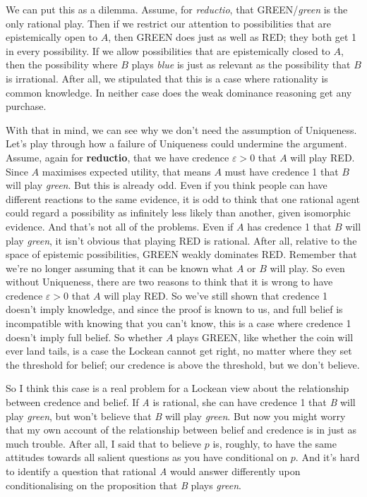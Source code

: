 We can put this as a dilemma. Assume, for \textit{reductio}, that GREEN/\textit{green} is the only rational play. Then if we restrict our attention to possibilities that are epistemically open to $A$, then GREEN does just as well as RED; they both get 1 in every possibility. If we allow possibilities that are epistemically closed to $A$, then the possibility where $B$ plays \textit{blue} is just as relevant as the possibility that $B$ is irrational. After all, we stipulated that this is a case where rationality is common knowledge. In neither case does the weak dominance reasoning get any purchase.

With that in mind, we can see why we don't need the assumption of Uniqueness. Let's play through how a failure of Uniqueness could undermine the argument. Assume, again for \textbf{reductio}, that we have credence $\varepsilon > 0$ that $A$ will play RED. Since $A$ maximises expected utility, that means $A$ must have credence 1 that $B$ will play \textit{green}. But this is already odd. Even if you think people can have different reactions to the same evidence, it is odd to think that one rational agent could regard a possibility as infinitely less likely than another, given isomorphic evidence. And that's not all of the problems. Even if $A$ has credence 1 that $B$ will play \textit{green}, it isn't obvious that playing RED is rational. After all, relative to the space of epistemic possibilities, GREEN weakly dominates RED. Remember that we're no longer assuming that it can be known what $A$ or $B$ will play. So even without Uniqueness, there are two reasons to think that it is wrong to have credence $\varepsilon > 0$ that $A$ will play RED. So we've still shown that credence 1 doesn't imply knowledge, and since the proof is known to us, and full belief is incompatible with knowing that you can't know, this is a case where credence 1 doesn't imply full belief. So whether $A$ plays GREEN, like whether the coin will ever land tails, is a case the Lockean cannot get right, no matter where they set the threshold for belief; our credence is above the threshold, but we don't believe. 

So I think this case is a real problem for a Lockean view about the relationship between credence and belief. If \textit{A} is rational, she can have credence 1 that \textit{B} will play \textit{green}, but won't believe that \textit{B} will play \textit{green}. But now you might worry that my own account of the relationship between belief and credence is in just as much trouble. After all, I said that to believe $p$ is, roughly, to have the same attitudes towards all salient questions as you have conditional on $p$. And it's hard to identify a question that rational \textit{A} would answer differently upon conditionalising on the proposition that \textit{B} plays \textit{green}.

